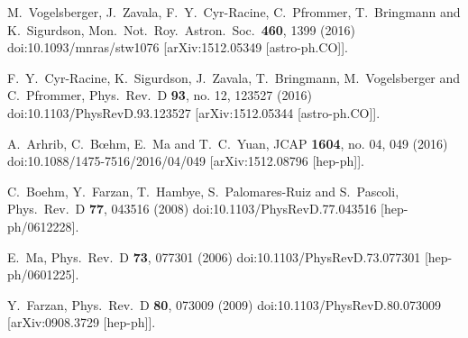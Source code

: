 \documentclass[aps,prd,a4paper,twocolumn,amsmath,showpacs,superscriptaddress,nofootinbib,preprintnumbers]{revtex4-1}
\begin{document}
\begin{thebibliography}{99}
  M.~Vogelsberger, J.~Zavala, F.~Y.~Cyr-Racine, C.~Pfrommer, T.~Bringmann and K.~Sigurdson,
  Mon.\ Not.\ Roy.\ Astron.\ Soc.\  {\bf 460}, 1399 (2016)
  doi:10.1093/mnras/stw1076
  [arXiv:1512.05349 [astro-ph.CO]].
  
  F.~Y.~Cyr-Racine, K.~Sigurdson, J.~Zavala, T.~Bringmann, M.~Vogelsberger and C.~Pfrommer,
  Phys.\ Rev.\ D {\bf 93}, no. 12, 123527 (2016)
  doi:10.1103/PhysRevD.93.123527
  [arXiv:1512.05344 [astro-ph.CO]].
  
 
  A.~Arhrib, C.~Bœhm, E.~Ma and T.~C.~Yuan,
  JCAP {\bf 1604}, no. 04, 049 (2016)
  doi:10.1088/1475-7516/2016/04/049
  [arXiv:1512.08796 [hep-ph]].
  
  C.~Boehm, Y.~Farzan, T.~Hambye, S.~Palomares-Ruiz and S.~Pascoli,
  Phys.\ Rev.\ D {\bf 77}, 043516 (2008)
  doi:10.1103/PhysRevD.77.043516
  [hep-ph/0612228].
  
  E.~Ma,
  Phys.\ Rev.\ D {\bf 73}, 077301 (2006)
  doi:10.1103/PhysRevD.73.077301
  [hep-ph/0601225].
  
  
  
  Y.~Farzan,
  Phys.\ Rev.\ D {\bf 80}, 073009 (2009)
  doi:10.1103/PhysRevD.80.073009
  [arXiv:0908.3729 [hep-ph]].
  

\end{thebibliography}
\end{document}
